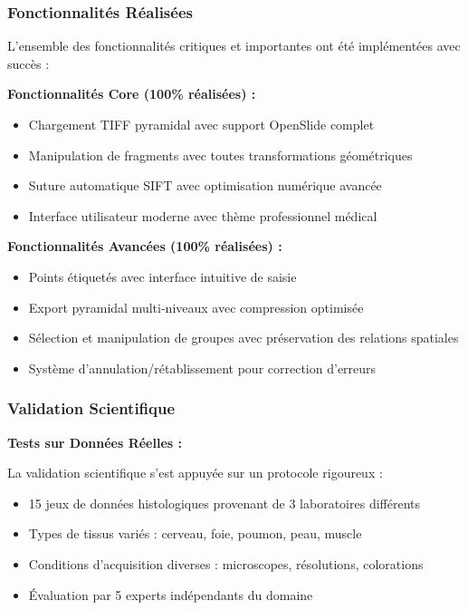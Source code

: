 \documentclass[12pt,a4paper]{article}
\begin{document}
\subsubsection{Fonctionnalités Réalisées}

L'ensemble des fonctionnalités critiques et importantes ont été implémentées avec succès :

\textbf{Fonctionnalités Core (100\% réalisées) :}
\begin{itemize}
\item Chargement TIFF pyramidal avec support OpenSlide complet
\item Manipulation de fragments avec toutes transformations géométriques
\item Suture automatique SIFT avec optimisation numérique avancée
\item Interface utilisateur moderne avec thème professionnel médical
\end{itemize}

\textbf{Fonctionnalités Avancées (100\% réalisées) :}
\begin{itemize}
\item Points étiquetés avec interface intuitive de saisie
\item Export pyramidal multi-niveaux avec compression optimisée
\item Sélection et manipulation de groupes avec préservation des relations spatiales
\item Système d'annulation/rétablissement pour correction d'erreurs
\end{itemize}

\subsubsection{Validation Scientifique}

\textbf{Tests sur Données Réelles :}

La validation scientifique s'est appuyée sur un protocole rigoureux :
\begin{itemize}
\item 15 jeux de données histologiques provenant de 3 laboratoires différents
\item Types de tissus variés : cerveau, foie, poumon, peau, muscle
\item Conditions d'acquisition diverses : microscopes, résolutions, colorations
\item Évaluation par 5 experts indépendants du domaine
\end{itemize}
\end{document}

